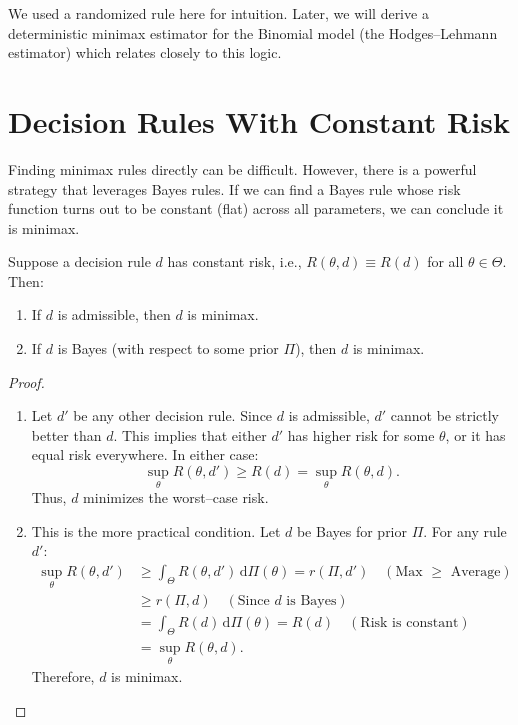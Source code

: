 \begin{remark}
    We used a randomized rule here for intuition. Later, we will derive a deterministic minimax estimator for the Binomial model (the Hodges--Lehmann estimator) which relates closely to this logic.
\end{remark}

\section{Decision Rules With Constant Risk}
\label{subsec:constant_risk}

Finding minimax rules directly can be difficult. However, there is a powerful strategy that leverages Bayes rules. If we can find a Bayes rule whose risk function turns out to be constant (flat) across all parameters, we can conclude it is minimax.

\begin{lemma}
\label{lem:constant_risk}

Suppose a decision rule \(d\) has constant risk, i.e., \(R(\theta, d) \equiv R(d)\) for all \(\theta \in \Theta\). Then:
\begin{enumerate}
    \item[(i)] If \(d\) is admissible, then \(d\) is minimax.
    \item[(ii)] If \(d\) is Bayes (with respect to some prior \(\Pi\)), then \(d\) is minimax.
\end{enumerate}
\end{lemma}

\begin{proof}
    \leavevmode
    \begin{enumerate}
        \item[(i)] Let \(d'\) be any other decision rule. Since \(d\) is admissible, \(d'\) cannot be strictly better than \(d\). This implies that either \(d'\) has higher risk for some \(\theta\), or it has equal risk everywhere. In either case:
        \[ \sup_{\theta} R(\theta, d') \ge R(d) = \sup_{\theta} R(\theta, d). \]
        Thus, \(d\) minimizes the worst--case risk.
        
        \item[(ii)] This is the more practical condition. Let \(d\) be Bayes for prior \(\Pi\). For any rule \(d'\):
        \[
        \begin{split}
            \sup_{\theta} R(\theta, d') &\ge \int_{\Theta} R(\theta, d') \, \mathrm{d}\Pi(\theta) = r(\Pi, d') \quad (\text{Max } \ge \text{ Average}) \\
            &\ge r(\Pi, d) \quad (\text{Since } d \text{ is Bayes}) \\
            &= \int_{\Theta} R(d) \, \mathrm{d}\Pi(\theta) = R(d) \quad (\text{Risk is constant}) \\
            &= \sup_{\theta} R(\theta, d).
        \end{split}
        \]
        Therefore, \(d\) is minimax.
    \end{enumerate}
\end{proof}



